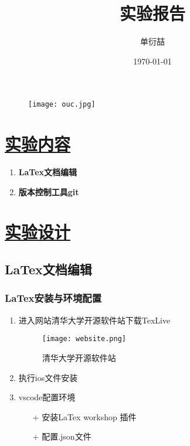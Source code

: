 \documentclass[a4paper,12pt]{article}
\begin{document}
\begin{figure}[t]
    \texttt{[image: ouc.jpg]}
\end{figure}

\title{实验报告}
\author{单衍喆 }
\date{\today}
\maketitle

\tableofcontents
\newpage


\section{\underline{\color{blue}实验内容}}

\begin{enumerate}
    \item \textbf{LaTex文档编辑}
    \item \textbf{版本控制工具git}
\end{enumerate}
\section{\underline{\color{blue}实验设计}}
\subsection{\color{red}LaTex文档编辑}

\subsubsection{\color{green}LaTex安装与环境配置}
\begin{enumerate}
    \item 进入网站清华大学开源软件站下载TexLive
          \begin{figure}[htbp]
              \centering
              \texttt{[image: website.png]}
              \caption{清华大学开源软件站}
              \label{website}
          \end{figure}
    \item 执行ios文件安装
    \item vscode配置环境
          \begin{itemize}
              \item[+] 安装LaTex workshop 插件
              \item[+] 配置.json文件
          \end{itemize}
\end{enumerate}
\end{document}
